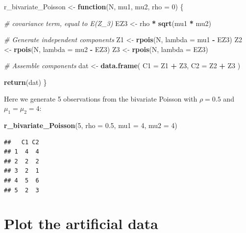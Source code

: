 \documentclass[
]{book}
\newenvironment{Shaded}{\begin{snugshade}}{\end{snugshade}}
\newcommand{\AttributeTok}[1]{\textcolor[rgb]{0.13,0.29,0.53}{#1}}
\newcommand{\CommentTok}[1]{\textcolor[rgb]{0.56,0.35,0.01}{\textit{#1}}}
\newcommand{\ControlFlowTok}[1]{\textcolor[rgb]{0.13,0.29,0.53}{\textbf{#1}}}
\newcommand{\DecValTok}[1]{\textcolor[rgb]{0.00,0.00,0.81}{#1}}
\newcommand{\FloatTok}[1]{\textcolor[rgb]{0.00,0.00,0.81}{#1}}
\newcommand{\FunctionTok}[1]{\textcolor[rgb]{0.13,0.29,0.53}{\textbf{#1}}}
\newcommand{\NormalTok}[1]{#1}
\newcommand{\OtherTok}[1]{\textcolor[rgb]{0.56,0.35,0.01}{#1}}
\newcommand{\SpecialCharTok}[1]{\textcolor[rgb]{0.81,0.36,0.00}{\textbf{#1}}}
\begin{document}
\begin{Shaded}
\begin{Highlighting}[]
\NormalTok{r\_bivariate\_Poisson }\OtherTok{\textless{}{-}} \ControlFlowTok{function}\NormalTok{(N, mu1, mu2, }\AttributeTok{rho =} \DecValTok{0}\NormalTok{) \{}
  
  \CommentTok{\# covariance term, equal to E(Z\_3)}
\NormalTok{  EZ3 }\OtherTok{\textless{}{-}}\NormalTok{ rho }\SpecialCharTok{*} \FunctionTok{sqrt}\NormalTok{(mu1 }\SpecialCharTok{*}\NormalTok{ mu2) }
  
  \CommentTok{\# Generate independent components}
\NormalTok{  Z1 }\OtherTok{\textless{}{-}} \FunctionTok{rpois}\NormalTok{(N, }\AttributeTok{lambda =}\NormalTok{ mu1 }\SpecialCharTok{{-}}\NormalTok{ EZ3)}
\NormalTok{  Z2 }\OtherTok{\textless{}{-}} \FunctionTok{rpois}\NormalTok{(N, }\AttributeTok{lambda =}\NormalTok{ mu2 }\SpecialCharTok{{-}}\NormalTok{ EZ3)}
\NormalTok{  Z3 }\OtherTok{\textless{}{-}} \FunctionTok{rpois}\NormalTok{(N, }\AttributeTok{lambda =}\NormalTok{ EZ3)}
  
  \CommentTok{\# Assemble components}
\NormalTok{  dat }\OtherTok{\textless{}{-}} \FunctionTok{data.frame}\NormalTok{(}
    \AttributeTok{C1 =}\NormalTok{ Z1 }\SpecialCharTok{+}\NormalTok{ Z3,}
    \AttributeTok{C2 =}\NormalTok{ Z2 }\SpecialCharTok{+}\NormalTok{ Z3}
\NormalTok{  )}
  
  \FunctionTok{return}\NormalTok{(dat)}
\NormalTok{\}}
\end{Highlighting}
\end{Shaded}

Here we generate 5 observations from the bivariate Poisson with \(\rho = 0.5\) and \(\mu_1 = \mu_2 = 4\):

\begin{Shaded}
\begin{Highlighting}[]
\FunctionTok{r\_bivariate\_Poisson}\NormalTok{(}\DecValTok{5}\NormalTok{, }\AttributeTok{rho =} \FloatTok{0.5}\NormalTok{, }\AttributeTok{mu1 =} \DecValTok{4}\NormalTok{, }\AttributeTok{mu2 =} \DecValTok{4}\NormalTok{)}
\end{Highlighting}
\end{Shaded}

\begin{verbatim}
##   C1 C2
## 1  4  4
## 2  2  2
## 3  2  1
## 4  5  6
## 5  2  3
\end{verbatim}

\section{Plot the artificial data}\label{DGP-plotting}
\end{document}
